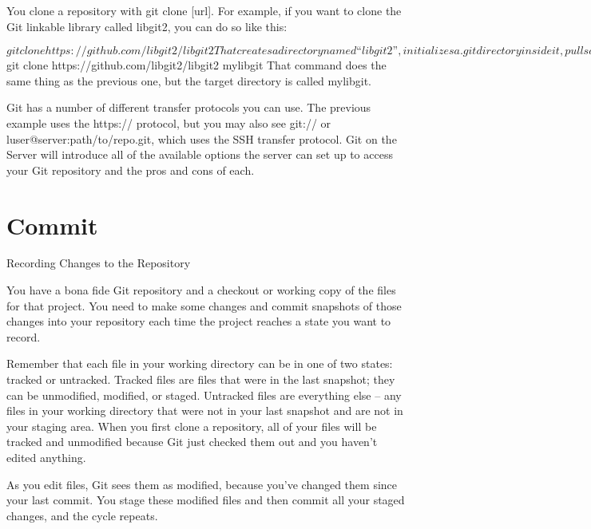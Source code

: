 You clone a repository with git clone [url]. For example, if you want to clone the Git linkable library called libgit2, you can do so like this:

$ git clone https://github.com/libgit2/libgit2
That creates a directory named “libgit2”, initializes a .git directory inside it, pulls down all the data for that repository, and checks out a working copy of the latest version. If you go into the new libgit2 directory, you’ll see the project files in there, ready to be worked on or used. If you want to clone the repository into a directory named something other than “libgit2”, you can specify that as the next command-line option:

$ git clone https://github.com/libgit2/libgit2 mylibgit
That command does the same thing as the previous one, but the target directory is called mylibgit.

Git has a number of different transfer protocols you can use. The previous example uses the https:// protocol, but you may also see git:// or luser@server:path/to/repo.git, which uses the SSH transfer protocol. Git on the Server will introduce all of the available options the server can set up to access your Git repository and the pros and cons of each.

\section{Commit}

Recording Changes to the Repository

You have a bona fide Git repository and a checkout or working copy of the files for that project. You need to make some changes and commit snapshots of those changes into your repository each time the project reaches a state you want to record.

Remember that each file in your working directory can be in one of two states: tracked or untracked. Tracked files are files that were in the last snapshot; they can be unmodified, modified, or staged. Untracked files are everything else – any files in your working directory that were not in your last snapshot and are not in your staging area. When you first clone a repository, all of your files will be tracked and unmodified because Git just checked them out and you haven’t edited anything.

As you edit files, Git sees them as modified, because you’ve changed them since your last commit. You stage these modified files and then commit all your staged changes, and the cycle repeats.



